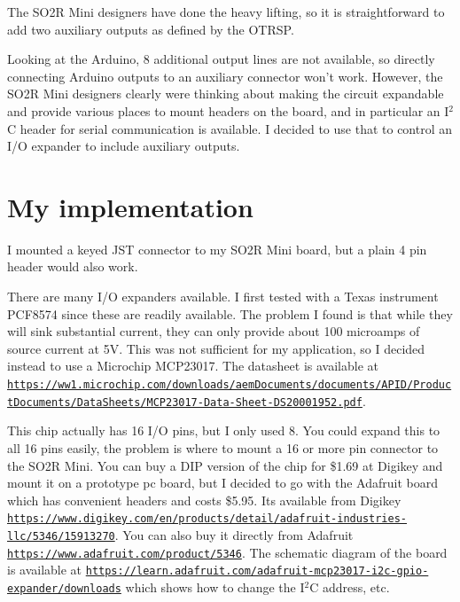 \documentclass[12pt]{article}
\begin{document}
The SO2R Mini designers have done the heavy lifting, so it is straightforward
to add two auxiliary outputs as defined by the OTRSP.

Looking at the Arduino, 8 additional output lines are not available, so
directly connecting Arduino outputs to an auxiliary connector won't work.
However,
the SO2R Mini designers clearly were thinking about making the circuit
expandable and provide various places to mount
headers on the board, and in particular an I$^2$C header for
serial communication is available. I decided to use that to control
an I/O expander to include auxiliary outputs.

\section{My implementation}
I mounted a keyed JST connector to my
SO2R Mini board, but a plain 4 pin header would also work.

There are many I/O expanders available. I first tested with a
Texas instrument PCF8574 since these are readily available.
The problem I found is that while they will sink substantial current,
they can only provide about 100 microamps of source current at 5V.
This was not sufficient for my application, so I decided instead to
use a Microchip
MCP23017. The datasheet is available at
\href{https://ww1.microchip.com/downloads/aemDocuments/documents/APID/ProductDocuments/DataSheets/MCP23017-Data-Sheet-DS20001952.pdf}
{\nolinkurl{https://ww1.microchip.com/downloads/aemDocuments/documents/APID/ProductDocuments/DataSheets/MCP23017-Data-Sheet-DS20001952.pdf}}.


This chip actually has 16 I/O pins, but I only used 8. You could expand
this to all 16 pins easily, the problem is where to mount a 16 or more pin
connector to the SO2R Mini.
You can buy a DIP version of the chip for \$1.69
at Digikey and mount it on a prototype pc board, but I decided to go
with the Adafruit board which has convenient
headers and costs \$5.95. Its available from Digikey
\href{https://www.digikey.com/en/products/detail/adafruit-industries-llc/5346/15913270}
{\nolinkurl{https://www.digikey.com/en/products/detail/adafruit-industries-llc/5346/15913270}}.
You can also buy it directly from Adafruit
\href{https://www.adafruit.com/product/5346}
{\nolinkurl{https://www.adafruit.com/product/5346}}.
The schematic diagram of the board is available at
\href{https://learn.adafruit.com/adafruit-mcp23017-i2c-gpio-expander/downloads}
{\nolinkurl{https://learn.adafruit.com/adafruit-mcp23017-i2c-gpio-expander/downloads}}
which shows how to change the I$^2$C address, etc.
\end{document}
